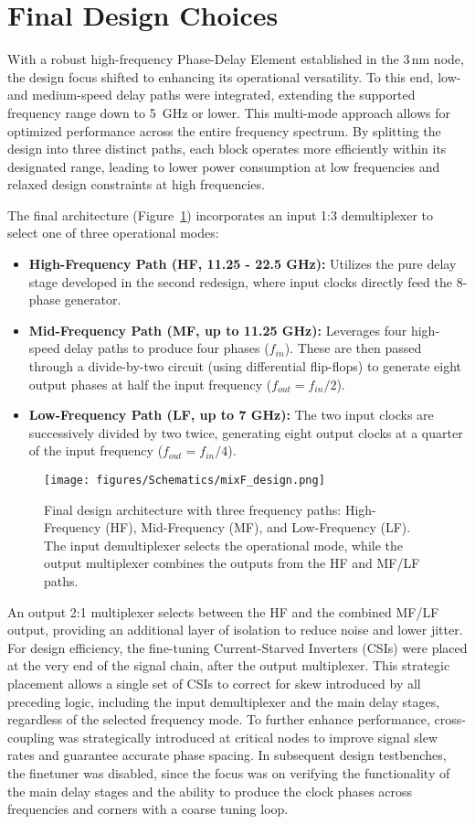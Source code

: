 \section{Final Design Choices}\label{sec:mixF_design}
With a robust high-frequency Phase-Delay Element established in the 3\,nm node, the design focus shifted to enhancing its operational versatility. To this end, low- and medium-speed delay paths were integrated, extending the supported frequency range down to 5~GHz or lower. This multi-mode approach allows for optimized performance across the entire frequency spectrum. By splitting the design into three distinct paths, each block operates more efficiently within its designated range, leading to lower power consumption at low frequencies and relaxed design constraints at high frequencies.

The final architecture (Figure~\ref{fig:mixF_design}) incorporates an input 1:3 demultiplexer to select one of three operational modes:
\begin{itemize}
    \item \textbf{High-Frequency Path (HF, 11.25 - 22.5 GHz):} Utilizes the pure delay stage developed in the second redesign, where input clocks directly feed the 8-phase generator.
    \item \textbf{Mid-Frequency Path (MF, up to 11.25 GHz):} Leverages four high-speed delay paths to produce four phases ($f_{in}$). These are then passed through a divide-by-two circuit (using differential flip-flops) to generate eight output phases at half the input frequency ($f_{out} = f_{in}/2$).
    \item \textbf{Low-Frequency Path (LF, up to 7 GHz):} The two input clocks are successively divided by two twice, generating eight output clocks at a quarter of the input frequency ($f_{out} = f_{in}/4$).
\end{itemize}
\begin{figure}[h]
  \centering
  \texttt{[image: figures/Schematics/mixF\_design.png]}
  \caption{Final design architecture with three frequency paths: High-Frequency (HF), Mid-Frequency (MF), and Low-Frequency (LF). The input demultiplexer selects the operational mode, while the output multiplexer combines the outputs from the HF and MF/LF paths.}
  \label{fig:mixF_design}
\end{figure}
An output 2:1 multiplexer selects between the HF and the combined MF/LF output, providing an additional layer of isolation to reduce noise and lower jitter. For design efficiency, the fine-tuning Current-Starved Inverters (CSIs) were placed at the very end of the signal chain, after the output multiplexer. This strategic placement allows a single set of CSIs to correct for skew introduced by all preceding logic, including the input demultiplexer and the main delay stages, regardless of the selected frequency mode.
To further enhance performance, cross-coupling was strategically introduced at critical nodes to improve signal slew rates and guarantee accurate phase spacing.
In subsequent design testbenches, the finetuner was disabled, since the focus was on verifying the functionality of the main delay stages and the ability to produce the clock phases across frequencies and corners with a coarse tuning loop.
